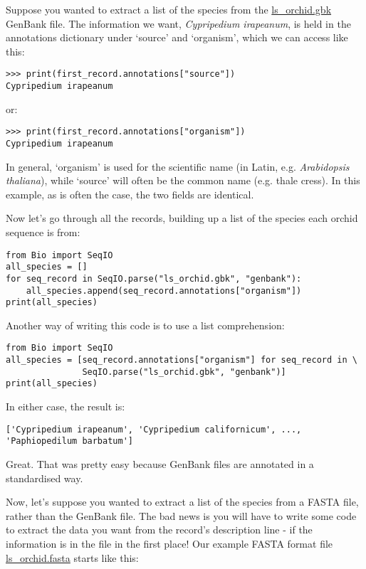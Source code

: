 Suppose you wanted to extract a list of the species from the \href{https://raw.githubusercontent.com/biopython/biopython/master/Doc/examples/ls_orchid.gbk}{ls\_orchid.gbk} GenBank file.  The information we want, \emph{Cypripedium irapeanum}, is held in the annotations dictionary under `source' and `organism', which we can access like this:

\begin{verbatim}
>>> print(first_record.annotations["source"])
Cypripedium irapeanum
\end{verbatim}

\noindent or:

\begin{verbatim}
>>> print(first_record.annotations["organism"])
Cypripedium irapeanum
\end{verbatim}

In general, `organism' is used for the scientific name (in Latin, e.g. \textit{Arabidopsis thaliana}),
while `source' will often be the common name (e.g. thale cress).  In this example, as is often the case,
the two fields are identical.

Now let's go through all the records, building up a list of the species each orchid sequence is from:

\begin{verbatim}
from Bio import SeqIO
all_species = []
for seq_record in SeqIO.parse("ls_orchid.gbk", "genbank"):
    all_species.append(seq_record.annotations["organism"])
print(all_species)
\end{verbatim}

Another way of writing this code is to use a list comprehension:

\begin{verbatim}
from Bio import SeqIO
all_species = [seq_record.annotations["organism"] for seq_record in \
               SeqIO.parse("ls_orchid.gbk", "genbank")]
print(all_species)
\end{verbatim}

\noindent In either case, the result is:

\begin{verbatim}
['Cypripedium irapeanum', 'Cypripedium californicum', ..., 'Paphiopedilum barbatum']
\end{verbatim}

Great.  That was pretty easy because GenBank files are annotated in a standardised way.

Now, let's suppose you wanted to extract a list of the species from a FASTA file, rather than the GenBank file.  The bad news is you will have to write some code to extract the data you want from the record's description line - if the information is in the file in the first place!  Our example FASTA format file \href{https://raw.githubusercontent.com/biopython/biopython/master/Doc/examples/ls_orchid.fasta}{ls\_orchid.fasta} starts like this:

